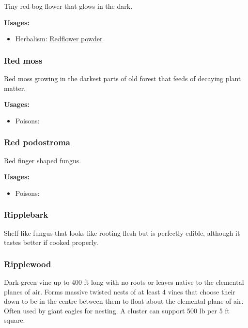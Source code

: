 Tiny red-bog flower that glows in the dark.

\vspace{5mm}

\textbf{Usages:}

\begin{itemize}[noitemsep]
\item[] Herbalism: \hyperref[Redflower powder]{Redflower powder}
\end{itemize}

\subsubsection{Red moss}
\label{Red moss}

Red moss growing in the darkest parts of old forest that feeds of decaying plant matter.

\vspace{5mm}

\textbf{Usages:}

\begin{itemize}[noitemsep]
\item[] Poisons: \poison
\end{itemize}

\subsubsection{Red podostroma}
\label{Red podostroma}

Red finger shaped fungus.

\vspace{5mm}

\textbf{Usages:}

\begin{itemize}[noitemsep]
\item[] Poisons: \poison
\end{itemize}

\subsubsection{Ripplebark}

Shelf-like fungus that looks like rooting flesh but is perfectly edible, although it tastes better if cooked properly.

\subsubsection{Ripplewood}
\label{Ripplewood}

Dark-green vine up to 400 ft long with no roots or leaves native to the elemental planes of air. Forms massive twisted nests of at least 4 vines that choose their down to be in the centre between them to float about the elemental plane of air. Often used by giant eagles for nesting. A cluster can support 500 lb per 5 ft square.

